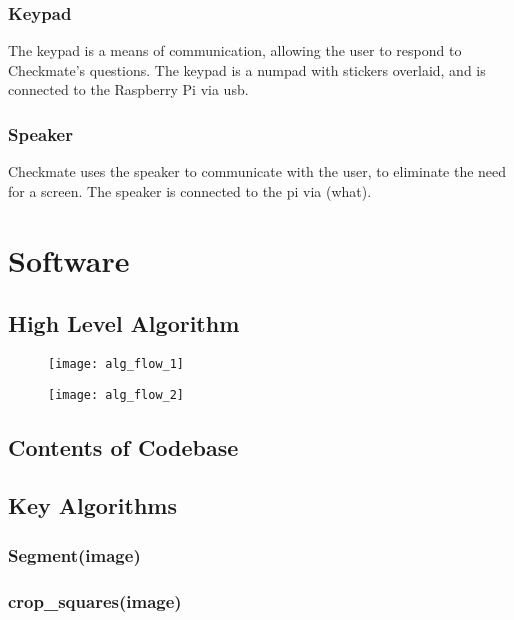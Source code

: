 \documentclass[onecolumn]{IEEEtran}
\begin{document}
\subsubsection{Keypad}
The keypad is a means of communication, allowing the user to respond to Checkmate's questions. The keypad is a numpad with stickers overlaid, and is connected to the Raspberry Pi via usb. 
\subsubsection{Speaker}
Checkmate uses the speaker to communicate with the user, to eliminate the need for a screen. The speaker is connected to the pi via (what). 
\section{Software}
\subsection{High Level Algorithm}

\begin{figure}[h!]
\centering
\begin{minipage}{.55\textwidth}
  \centering
  \texttt{[image: alg\_flow\_1]}
  \label{fig:test1}
\end{minipage}%
\hspace{-3.75cm}
\begin{minipage}{.65\textwidth}
  \centering
  \texttt{[image: alg\_flow\_2]}
  \label{fig:test2}
\end{minipage}
\end{figure}

\subsection{Contents of Codebase}
\subsection{Key Algorithms}
\subsubsection{Segment(image)}
\subsubsection{crop\_squares(image)} 
\end{document}
